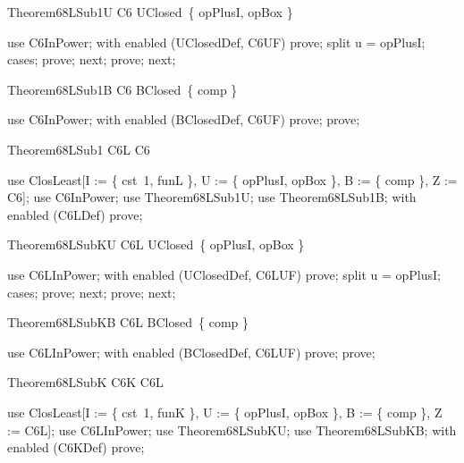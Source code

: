 \documentclass{article}
\begin{document}
\begin{theorem}{Theorem68LSub1U}
  C6 \in UClosed~\{ opPlusI, opBox \}
\end{theorem}

\begin{zproof}
use C6InPower;
with enabled (UClosedDef, C6UF) prove;
split u = opPlusI;
cases;
prove;
next;
prove;
next;
\end{zproof}

\begin{theorem}{Theorem68LSub1B}
  C6 \in BClosed~\{ comp \}
\end{theorem}

\begin{zproof}
use C6InPower;
with enabled (BClosedDef, C6UF) prove;
prove;
\end{zproof}

\begin{theorem}{Theorem68LSub1}
  C6L \subseteq C6
\end{theorem}

\begin{zproof}
use ClosLeast[I := \{ cst~1, funL \}, U := \{ opPlusI, opBox \}, B := \{ comp \}, Z := C6];
use C6InPower;
use Theorem68LSub1U;
use Theorem68LSub1B;
with enabled (C6LDef) prove;
\end{zproof}

\begin{theorem}{Theorem68LSubKU}
  C6L \in UClosed~\{ opPlusI, opBox \}
\end{theorem}

\begin{zproof}
use C6LInPower;
with enabled (UClosedDef, C6LUF) prove;
split u = opPlusI;
cases;
prove;
next;
prove;
next;
\end{zproof}

\begin{theorem}{Theorem68LSubKB}
  C6L \in BClosed~\{ comp \}
\end{theorem}

\begin{zproof}
use C6LInPower;
with enabled (BClosedDef, C6LUF) prove;
prove;
\end{zproof}

\begin{theorem}{Theorem68LSubK}
  C6K \subseteq C6L
\end{theorem}

\begin{zproof}
use ClosLeast[I := \{ cst~1, funK \}, U := \{ opPlusI, opBox \}, B := \{ comp \}, Z := C6L];
use C6LInPower;
use Theorem68LSubKU;
use Theorem68LSubKB;
with enabled (C6KDef) prove;
\end{zproof}
\end{document}
